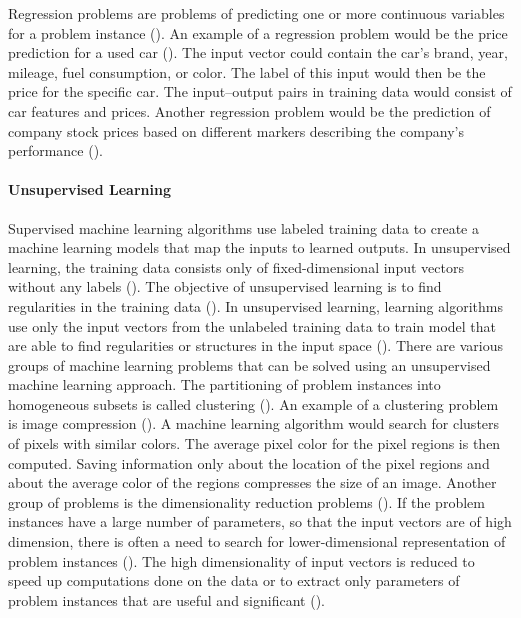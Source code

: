 \documentclass{BachelorBUI}
\begin{document}
                Regression problems are problems of predicting one or more continuous variables for a problem instance (\cite{Bishop:2006}). An example of a regression problem would be the price prediction for a used car (\cite{Alpaydin:2014}). The input vector could contain the car's brand, year, mileage, fuel consumption, or color. The label of this input would then be the price for the specific car. The input--output pairs in training data would consist of car features and prices. Another regression problem would be the prediction of company stock prices based on different markers describing the company's performance (\cite{Mohri:2018}).

            \paragraph{Unsupervised Learning}

                Supervised machine learning algorithms use labeled training data to create a machine learning models that map the inputs  to learned outputs. In unsupervised learning, the training data consists only of fixed-dimensional input vectors without any labels (\cite{Bishop:2006}). The objective of unsupervised learning is to find regularities in the training data (\cite{Alpaydin:2014}). In unsupervised learning, learning algorithms use only the input vectors from the unlabeled training data to train model that are able to find regularities or structures in the input space (\cite{Alpaydin:2014}). There are various groups of machine learning problems that can be solved using an unsupervised machine learning approach. The partitioning of problem instances into homogeneous subsets is called clustering (\cite{Mohri:2018}). An example of a clustering problem is image compression (\cite{Alpaydin:2014}). A machine learning algorithm would search for clusters of pixels with similar colors. The average pixel color for the pixel regions is then computed. Saving information only about the location of the pixel regions and about the average color of the regions compresses the size of an image. Another group of problems is the dimensionality reduction problems (\cite{Mohri:2018}). If the problem instances have a large number of parameters, so that the input vectors are of high dimension, there is often a need to search for lower-dimensional representation of problem instances (\cite{Mohri:2018}). The high dimensionality of input vectors is reduced to speed up computations done on the data or to extract only parameters of problem instances that are useful and significant (\cite{Mohri:2018}).
\end{document}
